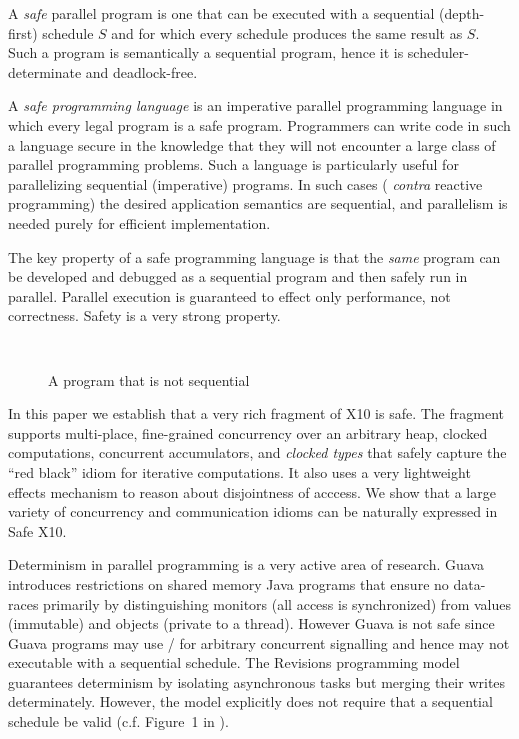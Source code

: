 A {\em safe} parallel program is one that can be executed with a
sequential (depth-first) schedule $S$ and for which every schedule
produces the same result as $S$.  Such a program is semantically a
sequential program, hence it is scheduler-determinate and
deadlock-free.

A {\em safe programming language} is an imperative parallel
programming language in which every legal program is a safe
program. Programmers can write code in such a language secure in the
knowledge that they will not encounter a large class of parallel
programming problems. Such a language is particularly useful for
parallelizing sequential (imperative) programs. In such cases ({\em
  contra} reactive programming) the desired application semantics are
sequential, and parallelism is needed purely for efficient
implementation.

The key property of a safe programming language is that the {\em same}
program can be developed and debugged as a sequential program and then
safely run in parallel. Parallel execution is guaranteed to effect
only performance, not correctness. Safety is a very strong property.

\begin{figure}
  \begin{lstlisting}
    
  \end{lstlisting}
  \caption{A program that is not sequential}
  
\end{figure}
In this paper we establish that a very rich fragment of X10 is safe.
The fragment supports multi-place, fine-grained concurrency
over an arbitrary heap, clocked computations, concurrent accumulators,
and {\em clocked types} that safely capture the ``red black'' idiom
for iterative computations. It also uses a very lightweight effects
mechanism to reason about disjointness of acccess. We show that a
large variety of concurrency and communication idioms can be naturally
expressed in Safe X10.

Determinism in parallel programming is a very active area of research.
Guava \cite{guava} introduces restrictions on shared memory Java
programs that ensure no data-races primarily by distinguishing
monitors (all access is synchronized) from values (immutable) and
objects (private to a thread). However Guava is not safe since Guava
programs may use / for arbitrary concurrent
signalling and hence may not executable with a sequential
schedule. The Revisions programming model \cite{Revisions} guarantees
determinism by isolating asynchronous tasks but merging their writes
determinately. However, the model explicitly does not require that
a sequential schedule be valid (c.f. Figure~1 in \cite{Revisions}).

